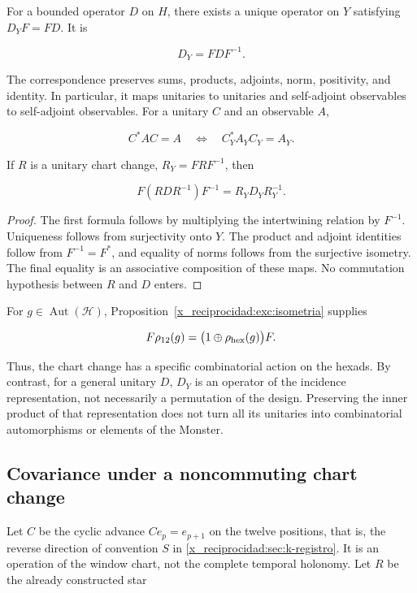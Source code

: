 \begin{theorem}
For a bounded operator \(D\) on \(H\), there exists a unique operator on \(Y\) satisfying \(D_YF=FD\). It is

\[
D_Y=FDF^{-1}.
\]

The correspondence preserves sums, products, adjoints, norm, positivity, and identity. In particular, it maps unitaries to unitaries and self-adjoint observables to self-adjoint observables. For a unitary \(C\) and an observable \(A\),

\[
C^*AC=A\quad\Longleftrightarrow\quad C_Y^*A_YC_Y=A_Y.
\]

If \(R\) is a unitary chart change, \(R_Y=FRF^{-1}\), then

\[
F(RDR^{-1})F^{-1}=R_YD_YR_Y^{-1}.
\]
\end{theorem}

\begin{proof}
The first formula follows by multiplying the intertwining relation by \(F^{-1}\). Uniqueness follows from surjectivity onto \(Y\). The product and adjoint identities follow from \(F^{-1}=F^*\), and equality of norms follows from the surjective isometry. The final equality is an associative composition of these maps. No commutation hypothesis between \(R\) and \(D\) enters.
\end{proof}

For \(g\in\operatorname{Aut}(\mathcal H)\), Proposition~\ref{x_reciprocidad:exc:isometria} supplies

\[
F\rho_{12}(g)=\bigl(1\oplus\rho_{\rm hex}(g)\bigr)F.
\]

Thus, the chart change has a specific combinatorial action on the hexads. By contrast, for a general unitary \(D\), \(D_Y\) is an operator of the incidence representation, not necessarily a permutation of the design. Preserving the inner product of that representation does not turn all its unitaries into combinatorial automorphisms or elements of the Monster.

\subsection{Covariance under a noncommuting chart change}

Let \(C\) be the cyclic advance \(Ce_p=e_{p+1}\) on the twelve positions, that is, the reverse direction of convention \(S\) in \cref{x_reciprocidad:sec:k-registro}. It is an operation of the window chart, not the complete temporal holonomy. Let \(R\) be the already constructed star

